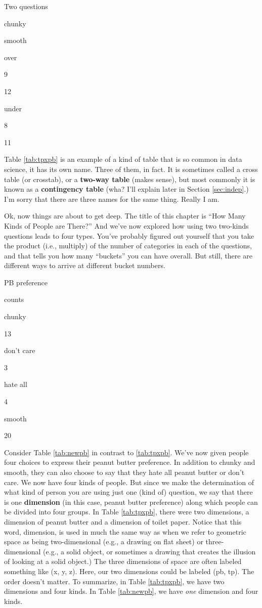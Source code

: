 \documentclass[]{book}
\begin{document}
\label{tab:tpxpb}Two questions

chunky

smooth

over

9

12

under

8

11

Table \ref{tab:tpxpb} is an example of a kind of table that is so common in data science, it has its own name. Three of them, in fact. It is sometimes called a cross table (or crosstab), or a \textbf{two-way table} (makes sense), but most commonly it is known as a \textbf{contingency table} (wha? I'll explain later in Section \ref{sec:indep}.) I'm sorry that there are three names for the same thing. Really I am.

Ok, now things are about to get deep. The title of this chapter is ``How Many Kinds of People are There?'' And we've now explored how using two two-kinds questions leads to four types. You've probably figured out yourself that you take the product (i.e., multiply) of the number of categories in each of the questions, and that tells you how many ``buckets'' you can have overall. But still, there are different ways to arrive at different bucket numbers.

\label{tab:newpb}PB preference

counts

chunky

13

don't care

3

hate all

4

smooth

20

Consider Table \ref{tab:newpb} in contrast to \ref{tab:tpxpb}. We've now given people four choices to express their peanut butter preference. In addition to chunky and smooth, they can also choose to say that they hate all peanut butter or don't care. We now have four kinds of people. But since we make the determination of what kind of person you are using just one (kind of) question, we say that there is one \textbf{dimension} (in this case, peanut butter preference) along which people can be divided into four groups. In Table \ref{tab:tpxpb}, there were two dimensions, a dimension of peanut butter and a dimension of toilet paper. Notice that this word, dimension, is used in much the same way as when we refer to geometric space as being two-dimensional (e.g., a drawing on flat sheet) or three-dimensional (e.g., a solid object, or sometimes a drawing that creates the illusion of looking at a solid object.) The three dimensions of space are often labeled something like (x, y, z). Here, our two dimensions could be labeled (pb, tp). The order doesn't matter. To summarize, in Table \ref{tab:tpxpb}, we have two dimensions and four kinds. In Table \ref{tab:newpb}, we have \emph{one} dimension and four kinds.
\end{document}
